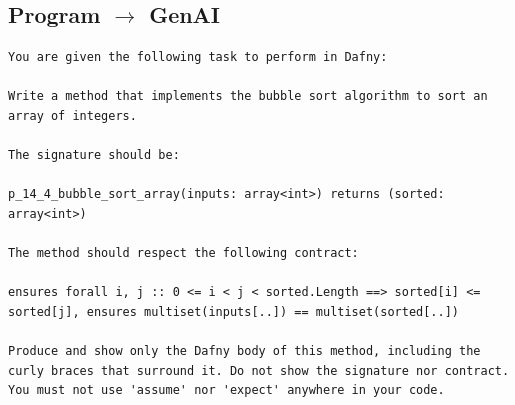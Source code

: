 \documentclass{article}
\begin{document}
\subsection*{Program $\rightarrow$ GenAI}
\begin{lstlisting}
You are given the following task to perform in Dafny:

Write a method that implements the bubble sort algorithm to sort an array of integers.

The signature should be:

p_14_4_bubble_sort_array(inputs: array<int>) returns (sorted: array<int>)

The method should respect the following contract:

ensures forall i, j :: 0 <= i < j < sorted.Length ==> sorted[i] <= sorted[j], ensures multiset(inputs[..]) == multiset(sorted[..])

Produce and show only the Dafny body of this method, including the curly braces that surround it. Do not show the signature nor contract. You must not use 'assume' nor 'expect' anywhere in your code.
\end{lstlisting}
\end{document}
